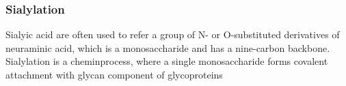 \subsubsection {Sialylation}
Sialyic acid are often used to refer a group of N- or O-substituted derivatives of neuraminic acid, which is a monosaccharide and has a nine-carbon backbone.~\cite{Vocadlo_2009} Sialylation is a cheminprocess, where a single monosaccharide forms covalent attachment with glycan component of glycoproteins